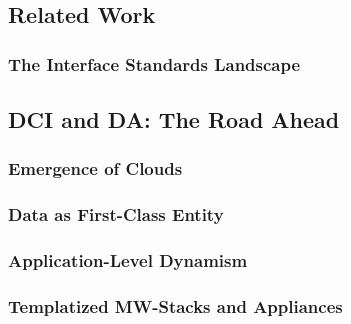 \documentclass[a4paper,12pt]{article}
\begin{document}
\subsection{Related Work}

\subsubsection{The Interface Standards Landscape}\label{interface_landscape}

\subsection{DCI and DA: The Road Ahead}

\subsubsection{Emergence of Clouds}

\subsubsection{Data as First-Class Entity}

\subsubsection{Application-Level Dynamism}

\subsubsection{Templatized MW-Stacks and Appliances}

 

\end{document}
